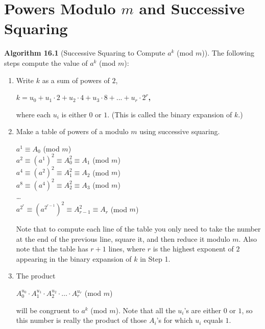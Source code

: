 \documentclass{article}
\newenvironment{nscenter}
 {\parskip=0pt\par\nopagebreak\centering}
 {\par\noindent\ignorespacesafterend}
\begin{document}
\section{Powers Modulo $m$ and Successive Squaring}

{\bf Algorithm 16.1} (Successive Squaring to Compute $a^k$ (mod $m$)). The following steps compute the value of $a^k$ (mod $m$):

\begin{enumerate}
\item Write $k$ as a sum of powers of $2$,
\begin{nscenter}
\bfseries $k = u_0 + u_1 \cdot 2 + u_2 \cdot 4 + u_3 \cdot 8 + ... + u_r \cdot 2^r$,
\end{nscenter}
where each $u_i$ is either $0$ or $1$. (This is called the binary expansion of $k$.)
\item Make a table of powers of a modulo $m$ using successive squaring.
\begin{nscenter}
$a^1 \equiv A_0 $ (mod $m$)\\
$a^2 \equiv (a^1)^2 \equiv A_0^2 \equiv A_1$ (mod $m$)\\
$a^4 \equiv (a^2)^2 \equiv A_1^2 \equiv A_2$ (mod $m$)\\
$a^8 \equiv (a^4)^2 \equiv A_2^2 \equiv A_3$ (mod $m$)\\
\ldots\\
$a^{2^r} \equiv (a^{2^{r-1}})^2 \equiv A_{r-1}^2 \equiv A_r$ (mod $m$)\\
\end{nscenter}
Note that to compute each line of the table you only need to take the number at the end of the previous line, square it, and then reduce it modulo $m$. Also note that the table has $r+1$ lines, where $r$ is the highest exponent of $2$ appearing in the binary expansion of $k$ in Step 1.
\item The product
\begin{nscenter}
$A_0^{u_0}\cdot A_1^{u_1}\cdot A_2^{u_2} \cdot \ldots \cdot A_r^{u_r} $ (mod $m$)
\end{nscenter}
will be congruent to $a^k$ (mod $m$). Note that all the $u_i$'s are either $0$ or $1$, so this number is really the product of those $A_i$'s for which $u_i$ equals $1$.
\end{enumerate}
\end{document}
